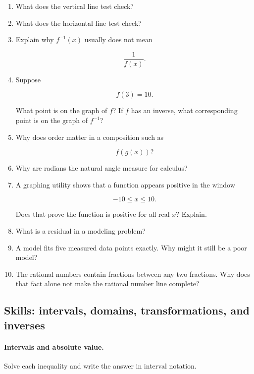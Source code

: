 \begin{enumerate}
is not the same function as

\[
p(x)=x+1
\]

when \(p\) has domain \(\mathbb R\).

\item What does the vertical line test check?

\item What does the horizontal line test check?

\item Explain why \(f^{-1}(x)\) usually does not mean

\[
\frac{1}{f(x)}.
\]

\item Suppose

\[
f(3)=10.
\]

What point is on the graph of \(f\)? If \(f\) has an inverse, what corresponding point is on the graph of \(f^{-1}\)?

\item Why does order matter in a composition such as

\[
f(g(x))?
\]

\item Why are radians the natural angle measure for calculus?

\item A graphing utility shows that a function appears positive in the window

\[
-10\le x\le 10.
\]

Does that prove the function is positive for all real \(x\)? Explain.

\item What is a residual in a modeling problem?

\item A model fits five measured data points exactly. Why might it still be a poor model?

\item The rational numbers contain fractions between any two fractions. Why does that fact alone not make the rational number line complete?
\end{enumerate}

\subsection{Skills: intervals, domains, transformations, and inverses}
\label{subsec:skills-domains-transformations}

\paragraph{Intervals and absolute value.}
Solve each inequality and write the answer in interval notation.

